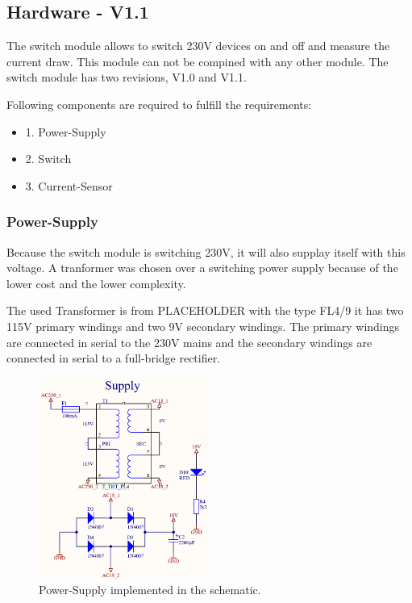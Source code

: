 \subsection{Hardware - V1.1}

    The switch module allows to switch 230V devices on and off and measure the current draw. 
    This module can not be compined with any other module. The switch module has two revisions,
    V1.0 and V1.1.

    Following components are required to fulfill the requirements:

    \begin{itemize}
        \item 1. Power-Supply
        \item 2. Switch
        \item 3. Current-Sensor
     
    \end{itemize}

    \subsubsection{Power-Supply}

        Because the switch module is switching 230V, it will also supplay itself with this voltage.
        A tranformer was chosen over a switching power supply because of the lower cost and the
        lower complexity.

        The used Transformer is from PLACEHOLDER with the type FL4/9 it has two 115V primary windings and
        two 9V secondary windings. The primary windings are connected in serial to the 230V mains and the
        secondary windings are connected in serial to a full-bridge rectifier. 

        \begin{figure}[H]
            \centering
            \includegraphics[width=0.5\textwidth]{assets/HW/Power-Supply-schematic.png}
            \caption{Power-Supply implemented in the schematic.}
        \end{figure}
        

